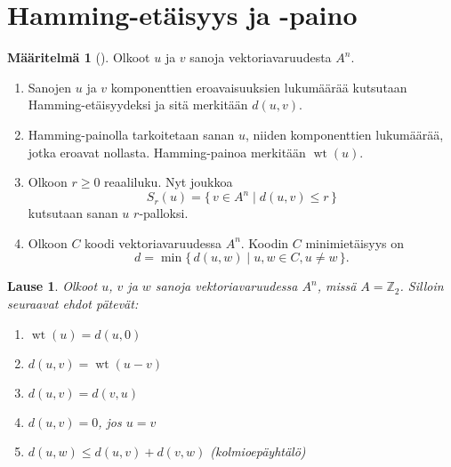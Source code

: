 \documentclass[a4paper,12pt,leqno,oneside]{report} %
\theoremstyle{plain}
\newtheorem{lause}{Lause}[chapter]
\theoremstyle{plain}
\theoremstyle{definition}
\newtheorem{maaritelma}{Määritelmä}[chapter]
\DeclareMathOperator{\wt}{wt}
\theoremstyle{remark}
\numberwithin{equation}{chapter}
\newcommand*{\Zset}{\mathbb{Z}}  %
\begin{document}
    \section{Hamming-etäisyys ja -paino}
    \begin{maaritelma}[{\cite[s.~492]{PA}}]\label{maar:perus}
        Olkoot $u$ ja $v$ sanoja vektoriavaruudesta $A^n$.
        \begin{enumerate}
            \item\label{kht:etaisyys} Sanojen $u$ ja $v$ komponenttien eroavaisuuksien lukumäärää kutsutaan \break{} Hamming-etäisyydeksi ja sitä merkitään $d(u,v)$.
            \item\label{kht:paino} Hamming-painolla tarkoitetaan sanan $u$, niiden komponenttien lukumäärää, jotka eroavat nollasta. Hamming-painoa merkitään
                $\wt(u)$.
            \item Olkoon $r\ge0$ reaaliluku. Nyt joukkoa
                \[
                    S_r(u) = \{\,v \in A^n \mid d(u, v) \le r \,\}
                \]
                kutsutaan sanan $u$ $r$-palloksi.
            \item Olkoon $C$ koodi vektoriavaruudessa $A^n$. Koodin $C$ minimietäisyys on
                \[
                    d = \min\{\, d(u, w) \mid u, w \in C, u \neq w \,\}.
                \]
        \end{enumerate}
    \end{maaritelma}

    \begin{lause}\label{lause:Hamming}
        Olkoot $u$, $v$ ja $w$ sanoja vektoriavaruudessa $A^n$, missä $A = \Zset_2$. Silloin seuraavat ehdot pätevät:
        \begin{enumerate}
            \item\label{kht:painoetaisyys} $\wt(u) = d(u, 0)$
            \item\label{kht:etaisyyspaino} $d(u, v) = \wt(u - v)$
            \item\label{kht:vaihdannaisuus}$d(u, v) = d(v, u)$
            \item\label{kht:nollaetaisyys} $d(u, v) = 0$, jos $u = v$
            \item\label{kht:kolmioey} $d(u, w) \le d(u, v) + d(v, w)$ \quad (kolmioepäyhtälö)
        \end{enumerate}
    \end{lause}
\end{document}
